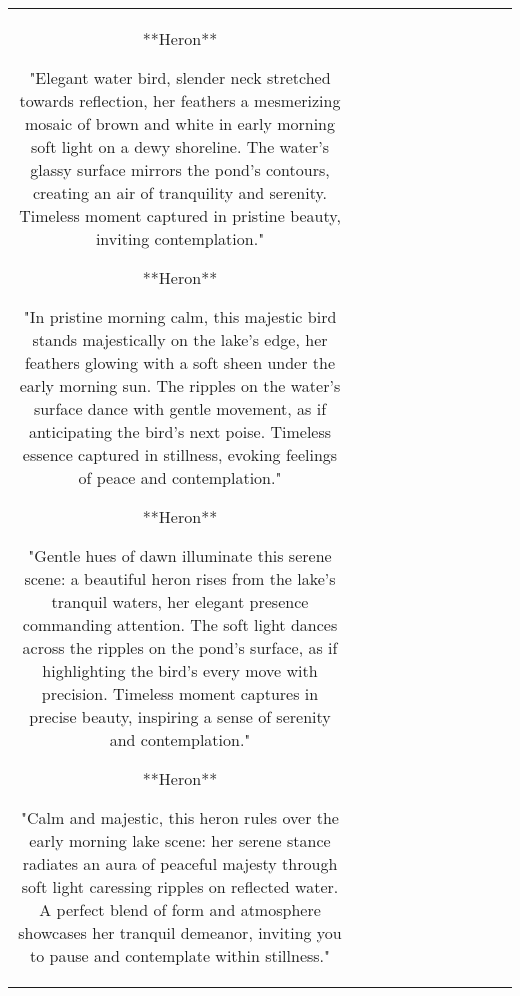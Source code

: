 \begin{table}[h!]
\begin{tabular}{|c|c|c|c|c|c|c|c|c|c|c|}
**Heron**

"Elegant water bird, slender neck stretched towards reflection, her feathers a mesmerizing mosaic of brown and white in early morning soft light on a dewy shoreline. The water's glassy surface mirrors the pond's contours, creating an air of tranquility and serenity. Timeless moment captured in pristine beauty, inviting contemplation."

**Heron**

"In pristine morning calm, this majestic bird stands majestically on the lake's edge, her feathers glowing with a soft sheen under the early morning sun. The ripples on the water's surface dance with gentle movement, as if anticipating the bird's next poise. Timeless essence captured in stillness, evoking feelings of peace and contemplation."

**Heron**

"Gentle hues of dawn illuminate this serene scene: a beautiful heron rises from the lake's tranquil waters, her elegant presence commanding attention. The soft light dances across the ripples on the pond's surface, as if highlighting the bird's every move with precision. Timeless moment captures in precise beauty, inspiring a sense of serenity and contemplation."

**Heron**

"Calm and majestic, this heron rules over the early morning lake scene: her serene stance radiates an aura of peaceful majesty through soft light caressing ripples on reflected water. A perfect blend of form and atmosphere showcases her tranquil demeanor, inviting you to pause and contemplate within stillness."


\end{tabular}
\end{table}
